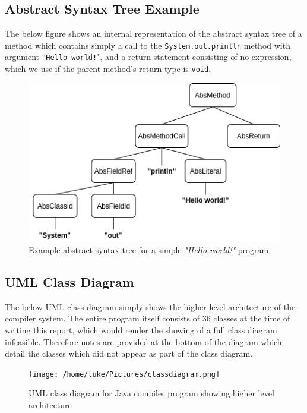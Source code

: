 \documentclass[a4paper, 11pt]{article}
\begin{document}
\subsection{Abstract Syntax Tree Example}
The below figure shows an internal representation of the abstract syntax tree of a method which contains simply a call to the \texttt{System.out.println} method with argument ``\texttt{Hello world!}", and a return statement consisting of no expression, which we use if the parent method's return type is \texttt{void}.
\begin{figure}[H]
\centering
\includegraphics[width=12cm]{resource/HelloWorldAST.png}
\caption{Example abstract syntax tree for a simple \textit{"Hello world!"} program}
\end{figure}

\newpage
\subsection{UML Class Diagram}
The below UML class diagram simply shows the higher-level architecture of the compiler system. The entire program itself consists of 36 classes at the time of writing this report, which would render the showing of a full class diagram infeasible. Therefore notes are provided at the bottom of the diagram which detail the classes which did not appear as part of the class diagram.
\begin{figure}[H]
\centering
\texttt{[image: /home/luke/Pictures/classdiagram.png]}
\caption{UML class diagram for Java compiler program showing higher level architecture}
\end{figure}
\newpage
\end{document}
